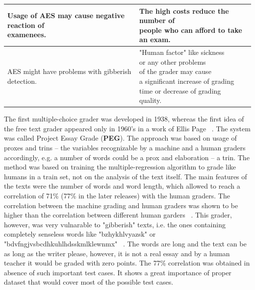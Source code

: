 \begin{table}[]
\begin{tabular}{|l|l|}
  \makecell{Usage of AES may cause negative reaction of \\examenees.} &  \makecell{The high costs reduce the number of\\people who can afford to take an exam.}  \\ \hline
    \makecell{AES might have problems with gibberish\\detection.} &  \makecell{"Human factor" like sickness\\ or any other problems\\of the grader may cause\\a significant increase of grading\\time or decrease of grading\\ quality. }  \\ \hline
\end{tabular}
\end{table}


The first multiple-choice grader was developed in 1938, whereas the first idea of the free text grader appeared only in 1960's in a work of Ellis Page ~\cite{Blood}. The system was called Project Essay Grade (\textbf{PEG}). The approach was based on usage of proxes and trins -- the variables recognizable by a machine and a human graders accordingly, e.g. a number of words could be a prox and elaboration -- a trin. The method was based on training the multiple-regression algorithm to grade like humans in a train set, not on the analysis of the text itself. The main features of the texts were the number of words and word length, which allowed to reach a correlation of 71\% (77\% in the later releases) with the human graders. The correlation between the machine grading and human graders was shown to be higher than the correlation between different human garders ~\cite{Blood}. This grader, however, was very vulnarable to "gibberish" texts, i.e. the ones containing completely senseless words like "bzhykhlvyazsk" or "bdvfngjvsbcdhkuhlhdsskmlklewnmx" ~\cite{Shermis}. The words are long and the text can be as long as the writer please, however, it is not a real essay and by a human teacher it would be graded with zero points. The 77\% correlation was obtained in absence of such important test cases. It shows a great importance of proper dataset that would cover most of the possible test cases. \\

